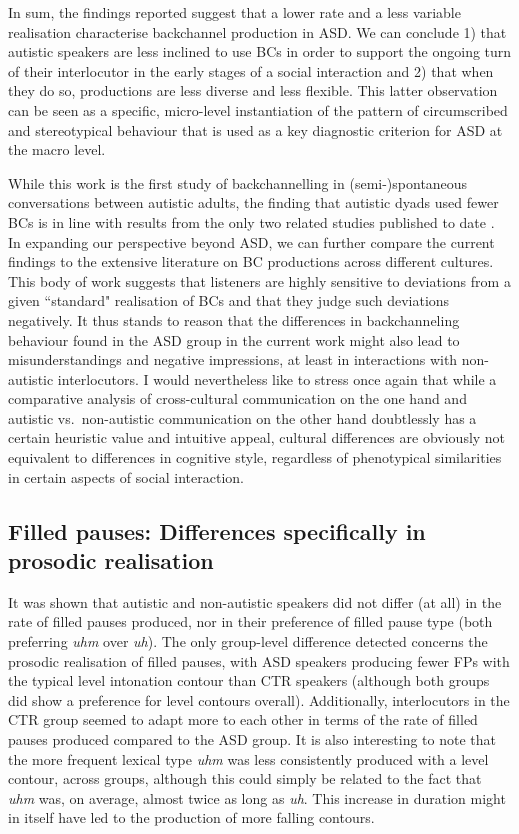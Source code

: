 In sum, the findings reported suggest that a lower rate and a less variable realisation characterise backchannel production in ASD. We can conclude 1) that autistic speakers are less inclined to use BCs in order to support the ongoing turn of their interlocutor in the early stages of a social interaction and 2) that when they do so, productions are less diverse and less flexible. This latter observation can be seen as a specific, micro-level instantiation of the pattern of circumscribed and stereotypical behaviour that is used as a key diagnostic criterion for ASD at the macro level.

While this work is the first study of backchannelling in (semi-)spontaneous conversations between autistic adults, the finding that autistic dyads used fewer BCs is in line with results from the only two related studies published to date \citep{rifaiInvestigatingMarkersRapport2022, yoshimuraTurntakingChildrenAutism2020}. In expanding our perspective beyond ASD, we can further compare the current findings to the extensive literature on BC productions across different cultures. This body of work suggests that listeners are highly sensitive to deviations from a given ``standard" realisation of BCs and that they judge such deviations negatively. It thus stands to reason that the differences in backchanneling behaviour found in the ASD group in the current work might also lead to misunderstandings and negative impressions, at least in interactions with non-autistic interlocutors. I would nevertheless like to stress once again that while a comparative analysis of cross-cultural communication on the one hand and autistic vs.~non-autistic communication on the other hand doubtlessly has a certain heuristic value and intuitive appeal, cultural differences are obviously not equivalent to differences in cognitive style, regardless of phenotypical similarities in certain aspects of social interaction.

\subsection{Filled pauses: Differences specifically in prosodic realisation}\label{BCFP_Discussion_FP}


It was shown that autistic and non-autistic speakers did not differ (at all) in the rate of filled pauses produced, nor in their preference of filled pause type (both preferring \emph{uhm} over \emph{uh}). The only group-level difference detected concerns the prosodic realisation of filled pauses, with ASD speakers producing fewer FPs with the typical level intonation contour than CTR speakers (although both groups did show a preference for level contours overall). Additionally, interlocutors in the CTR group seemed to adapt more to each other in terms of the rate of filled pauses produced compared to the ASD group. It is also interesting to note that the more frequent lexical type \emph{uhm} was less consistently produced with a level contour, across groups, although this could simply be related to the fact that \emph{uhm} was, on average, almost twice as long as \emph{uh}. This increase in duration might in itself have led to the production of more falling contours.

